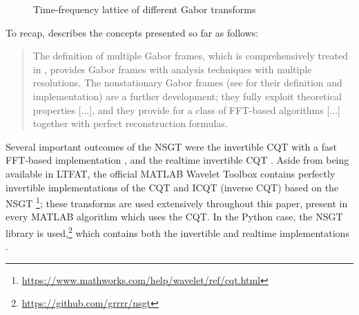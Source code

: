 \documentclass[letter,12pt]{article}
\begin{document}
\begin{figure}[ht]
	\centering
	\hspace{0.35em}
	\hspace{0.35em}
	\caption{Time-frequency lattice of different Gabor transforms}
	\label{fig:nsgts}
\end{figure}

To recap, \citet{adaptivecqt} describes the concepts presented so far as follows:

\begin{quote}
	The definition of multiple Gabor frames, which is comprehensively treated in \cite{doerflerphd}, provides Gabor frames with analysis techniques with multiple resolutions. The nonstationary Gabor frames (see \cite{balazs, jaillet} for their definition and implementation) are a further development; they fully exploit theoretical properties [...], and they provide for a class of FFT-based algorithms [...] together with perfect reconstruction formulas.
\end{quote}

Several important outcomes of the NSGT were the invertible CQT with a fast FFT-based implementation \cite{invertiblecqt}, and the realtime invertible CQT \cite{rtcqt}. Aside from being available in LTFAT, the official MATLAB Wavelet Toolbox contains perfectly invertible implementations of the CQT and ICQT (inverse CQT) based on the NSGT \footnote{\url{https://www.mathworks.com/help/wavelet/ref/cqt.html}}; these transforms are used extensively throughout this paper, present in every MATLAB algorithm which uses the CQT. In the Python case, the NSGT library is used,\footnote{\url{https://github.com/grrrr/nsgt}} which contains both the invertible and realtime implementations \cite{invertiblecqt, rtcqt}.
\end{document}
